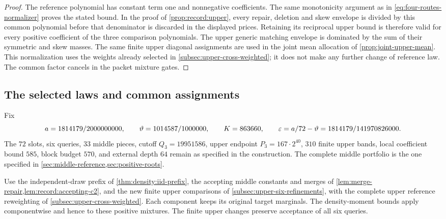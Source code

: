 \begin{proof}
The reference polynomial has constant term one and nonnegative
coefficients. The same monotonicity argument as in
\eqref{eq:four-routes-normalizer} proves the stated bound. In the proof
of \cref{prop:record:upper}, every repair, deletion and skew envelope
is divided by this common polynomial before that denominator is
discarded in the displayed prices. Retaining its reciprocal upper
bound is therefore valid for every positive coefficient of the three
comparison polynomials. The upper generic matching envelope is dominated by the sum of their symmetric and skew masses. The same finite upper diagonal assignments are used in the joint mean
allocation of \cref{prop:joint-upper-mean}. This normalization uses the
weights already selected in \cref{subsec:upper-cross-weighted};
it does not make any further change of reference law. The common
factor cancels in the packet mixture gates.
\end{proof}

\subsection{The selected laws and common assignments}

Fix
\[
 a=1814179/2000000000,\qquad \vartheta=1014587/1000000,\qquad
 K=863660,\qquad
 \varepsilon=a/72-\vartheta=1814179/141970826000.
\]
The $72$ slots, six queries, $33$ middle pieces, cutoff $Q_3=19951586$,
upper endpoint $P_3=167\cdot2^{40}$, $310$ finite upper bands,
local coefficient bound $585$, block budget $570$, and external depth
$64$ remain as specified in the construction. The complete middle
portfolio is the one specified in
\cref{sec:middle-reference,sec:positive-roots}.

Use the independent-draw prefix of \cref{thm:density:iid-prefix}, the
accepting middle constants and merges of
\cref{lem:merge-repair,lem:record:accepting-c2}, and the new finite upper
comparisons of \cref{subsec:upper-six-refinements}, with the complete
upper reference reweighting of \cref{subsec:upper-cross-weighted}.
Each component keeps its original target marginals. The density-moment
bounds apply componentwise and hence to these positive mixtures.
The finite upper changes preserve acceptance of all six queries.

